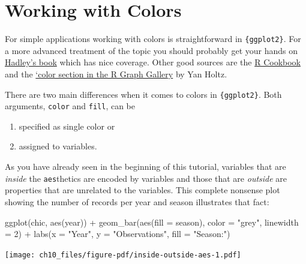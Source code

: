\documentclass[
  letterpaper,
]{scrbook}
\newenvironment{Shaded}{\begin{snugshade}}{\end{snugshade}}
\newcommand{\AttributeTok}[1]{\textcolor[rgb]{0.40,0.45,0.13}{#1}}
\newcommand{\DecValTok}[1]{\textcolor[rgb]{0.68,0.00,0.00}{#1}}
\newcommand{\FunctionTok}[1]{\textcolor[rgb]{0.28,0.35,0.67}{#1}}
\newcommand{\NormalTok}[1]{\textcolor[rgb]{0.00,0.23,0.31}{#1}}
\newcommand{\SpecialCharTok}[1]{\textcolor[rgb]{0.37,0.37,0.37}{#1}}
\newcommand{\StringTok}[1]{\textcolor[rgb]{0.13,0.47,0.30}{#1}}
\providecommand{\tightlist}{%
  \setlength{\itemsep}{0pt}\setlength{\parskip}{0pt}}\usepackage{longtable,booktabs,array}
\begin{document}

\chapter{Working with Colors}\label{colors}

For simple applications working with colors is straightforward in
\texttt{\{ggplot2\}}. For a more advanced treatment of the topic you
should probably get your hands on
\href{http://www.springer.com/de/book/9780387981413\#otherversion=9780387981406}{Hadley's
book} which has nice coverage. Other good sources are the
\href{http://www.cookbook-r.com/Graphs/Colors_(ggplot2)/}{R Cookbook}
and the \href{https://www.r-graph-gallery.com/ggplot2-color.html}{`color
section in the R Graph Gallery} by Yan Holtz.

There are two main differences when it comes to colors in
\texttt{\{ggplot2\}}. Both arguments, \texttt{color} and \texttt{fill},
can be

\begin{enumerate}
\def\labelenumi{\arabic{enumi}.}
\tightlist
\item
  specified as single color or
\item
  assigned to variables.
\end{enumerate}

As you have already seen in the beginning of this tutorial, variables
that are \emph{inside} the \texttt{aes}thetics are encoded by variables
and those that are \emph{outside} are properties that are unrelated to
the variables. This complete nonsense plot showing the number of records
per year and season illustrates that fact:

\begin{Shaded}
\begin{Highlighting}[]
\FunctionTok{ggplot}\NormalTok{(chic, }\FunctionTok{aes}\NormalTok{(year)) }\SpecialCharTok{+}
  \FunctionTok{geom\_bar}\NormalTok{(}\FunctionTok{aes}\NormalTok{(}\AttributeTok{fill =}\NormalTok{ season), }\AttributeTok{color =} \StringTok{"grey"}\NormalTok{, }\AttributeTok{linewidth =} \DecValTok{2}\NormalTok{) }\SpecialCharTok{+}
  \FunctionTok{labs}\NormalTok{(}\AttributeTok{x =} \StringTok{"Year"}\NormalTok{, }\AttributeTok{y =} \StringTok{"Observations"}\NormalTok{, }\AttributeTok{fill =} \StringTok{"Season:"}\NormalTok{)}
\end{Highlighting}
\end{Shaded}

\texttt{[image: ch10\_files/figure-pdf/inside-outside-aes-1.pdf]}
\end{document}
